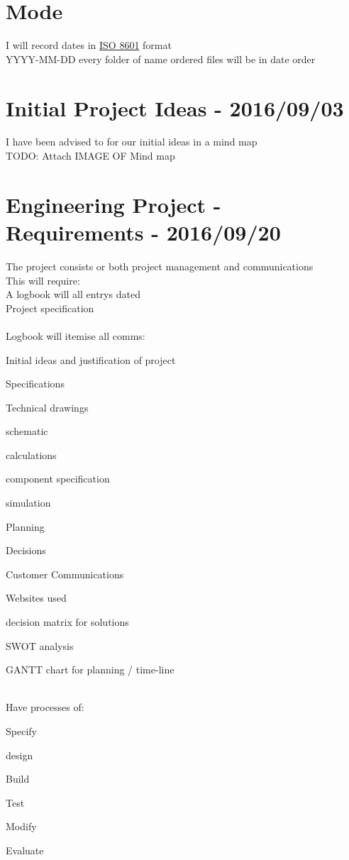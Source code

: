 \newpage
\section{Mode}
I will record dates in \href{https://en.wikipedia.org/wiki/ISO_8601}{ISO 8601} format\\
YYYY-MM-DD every folder of name ordered files will be in date order\\


\section{Initial Project Ideas - 2016/09/03}
I have been advised to for our initial ideas in a mind map\\
TODO: Attach IMAGE OF Mind map\\

\section{Engineering Project - Requirements - 2016/09/20}
The project consists or both project management and communications\\
This will require:\\
A logbook will all entrys dated\\
Project specification\\
\\
Logbook will itemise all comms:
\begin{itemize*}
  \item Initial ideas and justification of project
  \item Specifications
  \item Technical drawings
  \item schematic
  \item calculations
  \item component specification
  \item simulation
  \item Planning
  \item Decisions
  \item Customer Communications
  \item Websites used
  \item decision matrix for solutions
  \item SWOT analysis
  \item GANTT chart for planning / time-line
\end{itemize*}
\\
Have processes of:
\begin{itemize*}
  \item Specify
  \item design
  \item Build
  \item Test
  \item Modify
  \item Evaluate
\end{itemize*}

